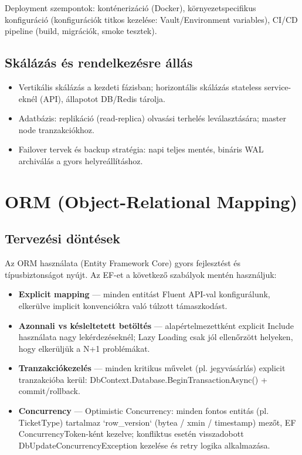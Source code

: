 \documentclass[colorlinks]{docs}
\theoremstyle{definition}
\theoremstyle{remark}
\begin{document}
Deployment szempontok: konténerizáció (Docker), környezetspecifikus konfiguráció (konfigurációk titkos kezelése: Vault/Environment variables), CI/CD pipeline (build, migrációk, smoke tesztek).

\subsection{Skálázás és rendelkezésre állás}
\begin{itemize}
    \item Vertikális skálázás a kezdeti fázisban; horizontális skálázás stateless service-eknél (API), állapotot DB/Redis tárolja.
    \item Adatbázis: replikáció (read-replica) olvasási terhelés leválasztására; master node tranzakciókhoz.
    \item Failover tervek és backup stratégia: napi teljes mentés, bináris WAL archiválás a gyors helyreállításhoz.
\end{itemize}

\section{ORM (Object-Relational Mapping)}
\subsection{Tervezési döntések}
Az ORM használata (Entity Framework Core) \cite{efcore} gyors fejlesztést és típusbiztonságot nyújt. Az EF-et a következő szabályok mentén használjuk:
\begin{itemize}
    \item \textbf{Explicit mapping} — minden entitást Fluent API-val konfigurálunk, elkerülve implicit konvenciókra való túlzott támaszkodást.
    \item \textbf{Azonnali vs késleltetett betöltés} — alapértelmezettként explicit Include használata nagy lekérdezéseknél; Lazy Loading csak jól ellenőrzött helyeken, hogy elkerüljük a N+1 problémákat.
    \item \textbf{Tranzakciókezelés} — minden kritikus művelet (pl. jegyvásárlás) explicit tranzakcióba kerül: DbContext.Database.BeginTransactionAsync() + commit/rollback.
    \item \textbf{Concurrency} — Optimistic Concurrency: minden fontos entitás (pl. TicketType) tartalmaz `row\_version` (bytea / xmin / timestamp) mezőt, EF ConcurrencyToken-ként kezelve; konfliktus esetén visszadobott DbUpdateConcurrencyException kezelése és retry logika alkalmazása.
\end{itemize}
\end{document}
